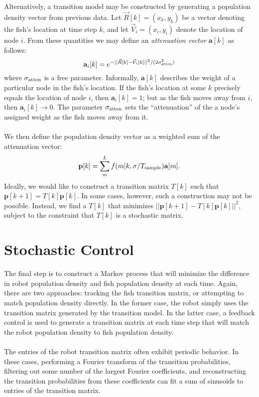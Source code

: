 \documentclass[11pt,letterpaper]{article}
\begin{document}
	Alternatively, a transition model may be constructed by generating a population density vector from previous data. Let $\vec{R}[k] = (x_k, y_k)$ be a vector denoting the fish's location at time step $k$, and let $\vec{V}_i = (x_i, y_i)$ denote the location of node $i$. From these quantities we may define an \textit{attenuation vector} $\mathbf{a}[k]$ as follows:
	\[
	\mathbf a_i[k] = e^{-||\vec{R}[k] - \vec{V}_i[k]||^2 / (2 \sigma_{\rm atten}^2)}
	\]
	where $\sigma_{\rm atten}$ is a free parameter. Informally, $\mathbf a[k]$ describes the weight of a particular node in the fish's location. If the fish's location at some $k$ precisely equals the location of node $i$, then $\mathbf a_i[k] = 1$; but as the fish moves away from $i$, then $\mathbf a_i[k] \rightarrow 0$. The parameter $\sigma_{\rm atten}$ sets the ``attenuation'' of the a node's assigned weight as the fish moves away from it.
	\\\\
	We then define the population density vector as a weighted sum of the attenuation vector:
	\[
	\mathbf p[k] = \sum^L_m f(m|k, \sigma / T_{\rm sample}) \mathbf a[m].
	\]
	Ideally, we would like to construct a transition matrix $T[k]$ such that $\mathbf{p}[k + 1] = T[k]\mathbf{p}[k]$. In some cases, however, such a construction may not be possible. Instead, we find a $T[k]$ that minimizes $||\mathbf p[k + 1] - T[k]\mathbf p[k] ||^2$, subject to the constraint that $T[k]$ is a stochastic matrix.
	
	\section{Stochastic Control}
	
	The final step is to construct a Markov process that will minimize the difference in robot population density and fish population density at each time. Again, there are two approaches: tracking the fish transition matrix, or attempting to match population density directly. In the former case, the robot simply uses the transition matrix generated by the transition model. In the latter case, a feedback control is used to generate a transition matrix at each time step that will match the robot population density to fish population density.
	\\\\
	The entries of the robot transition matrix often exhibit periodic behavior. In these cases, performing a Fourier transform of the transition probabilities, filtering out some number of the largest Fourier coefficients, and reconstructing the transition probabilities from these coefficients can fit a sum of sinusoids to entries of the transition matrix.
	
\end{document}
